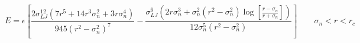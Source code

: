 \documentclass[12pt]{article}
\begin{document}
$$ 
E = \epsilon \left[ \frac{2  \sigma_{LJ}^{12} \left(7 r^5+14 r^3 \sigma_{n}^2+3 r \sigma_{n}^4\right) }{945 \left(r^2-\sigma_{n}^2\right)^7} -\frac{ \sigma_{LJ}^6 \left(2 r \sigma_{n}^3+\sigma_{n}^2 \left(r^2-\sigma_{n}^2\right)\log{ \left[\frac{r-\sigma_{n}}{r+\sigma_{n}}\right]}\right) }{12 \sigma_{n}^5 \left(r^2-\sigma_{n}^2\right)} \right]\qquad \sigma_n < r < r_c
$$
\end{document}
